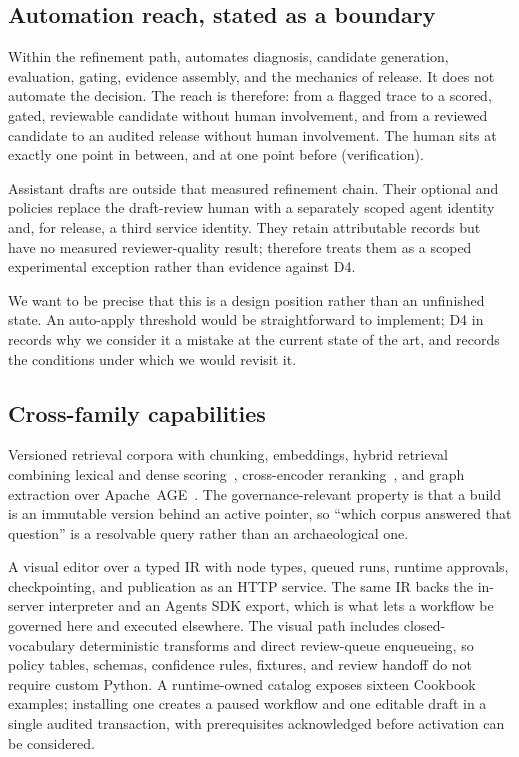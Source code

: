 \subsection{Automation reach, stated as a boundary}

Within the refinement path, \sys automates diagnosis, candidate generation, evaluation, gating, evidence
assembly, and the mechanics of release. It does not automate the decision. The
reach is therefore: from a flagged trace to a scored, gated, reviewable candidate
without human involvement, and from a reviewed candidate to an audited release
without human involvement. The human sits at exactly one point in between, and at
one point before (verification).

Assistant drafts are outside that measured refinement chain. Their optional
 and  policies replace the draft-review
human with a separately scoped agent identity and, for release, a third service
identity. They retain attributable records but have no measured reviewer-quality
result;  therefore treats them as a scoped experimental
exception rather than evidence against D4.

We want to be precise that this is a design position rather than an unfinished
state. An auto-apply threshold would be straightforward to implement; D4 in
 records why we consider it a mistake at the current state of
the art, and  records the conditions under which we would revisit
it.

\subsection{Cross-family capabilities}

 Versioned retrieval corpora with chunking, embeddings,
hybrid retrieval combining lexical and dense scoring~\cite{robertson2009bm25,
lewis2020rag}, cross-encoder reranking~\cite{nogueira2019bertrerank}, and graph
extraction over Apache~AGE~\cite{apacheage}. The governance-relevant property is
that a build is an immutable version behind an active pointer, so ``which corpus
answered that question'' is a resolvable query rather than an archaeological one.

 A visual editor over a typed IR with \statNodeTypes{} node types,
queued runs, runtime approvals, checkpointing, and publication as an HTTP service.
The same IR backs the in-server interpreter and an Agents SDK export, which is what
lets a workflow be governed here and executed elsewhere.  The visual path includes
closed-vocabulary deterministic transforms and direct review-queue enqueueing, so
policy tables, schemas, confidence rules, fixtures, and review handoff do not require
custom Python.  A runtime-owned catalog exposes sixteen Cookbook examples; installing
one creates a paused workflow and one editable draft in a single audited transaction,
with prerequisites acknowledged before activation can be considered.

